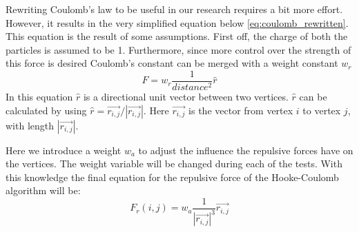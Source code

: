 \documentclass[a4paper,12pt]{article}
\begin{document}
    Rewriting Coulomb's law to be useful in our research requires a bit more effort.
    However, it results in the very simplified equation below \ref{eq:coulomb_rewritten}.
    This equation is the result of some assumptions.
    First off, the charge of both the particles is assumed to be 1.
    Furthermore, since more control over the strength of this force is desired Coulomb's constant can be merged with a weight constant $w_{r}$
    \begin{equation} \label{eq:coulomb_rewritten}
      F = w_{r} \frac{1}{distance^2} \hat{r}
    \end{equation}
    In this equation $\hat{r}$ is a directional unit vector between two vertices.
    $\hat{r}$ can be calculated by using $\hat{r} = \vec{r_{i,j}} / |\vec{r_{i,j}}|$.
    Here $\vec{r_{i,j}}$ is the vector from vertex $i$ to vertex $j$, with length $|\vec{r_{i,j}}|$.

    Here we introduce a weight $w_a $ to adjust the influence the repulsive forces have on the vertices.
    The weight variable will be changed during each of the tests.
    With this knowledge the final equation for the repulsive force of the Hooke-Coulomb algorithm will be:
    \begin{equation}
      F_r(i,j) = w_a \frac{1}{|\vec{r_{i,j}}|^3} \vec{r_{i,j}}
    \end{equation}
\end{document}
